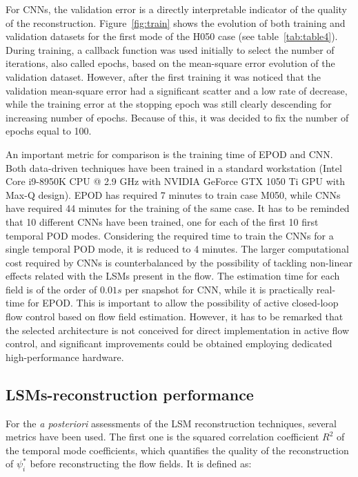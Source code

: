 For CNNs, the validation error is a directly interpretable indicator of the quality of the reconstruction.
Figure~\ref{fig:train} shows the evolution of both training and validation datasets for the first mode of the H050 case (see table~\ref{tab:table4}).
During training, a callback function was used initially to select the number of iterations, also called epochs, based on the mean-square error evolution of the validation dataset.
However, after the first training it was noticed that the validation mean-square error had a significant scatter and a low rate of decrease, while the training error at the stopping epoch was still clearly descending for increasing number of epochs. Because of this, it was decided to fix the number of epochs equal to 100.

An important metric for comparison is the training time of EPOD and CNN.
Both data-driven techniques have been trained in a standard workstation (Intel\textsuperscript{\textregistered}  Core\textsuperscript{\texttrademark} i9-8950K CPU @ 2.9 GHz with NVIDIA GeForce\textsuperscript{\textregistered} GTX 1050 Ti GPU with Max-Q design).
EPOD has required 7 minutes to train case M050, while CNNs have required 44 minutes for the training of the same case.
It has to be reminded that 10 different CNNs have been trained, one for each of the first 10 first temporal POD modes.
Considering the required time to train the CNNs for a single temporal POD mode, it is reduced to 4 minutes.
The larger computational cost required by CNNs is counterbalanced by the possibility of tackling non-linear effects related with the LSMs present in the flow.
The estimation time for each field is of the order of $0.01s$ per snapshot for CNN, while it is practically real-time for EPOD.
This is important to allow the possibility of active closed-loop flow control based on flow field estimation.
However, it has to be remarked that the selected architecture is not conceived for direct implementation in active flow control, and significant improvements could be obtained employing dedicated high-performance hardware.

\subsection{\label{sec:0302}LSMs-reconstruction performance}

For the \textit{a posteriori} assessments of the LSM reconstruction techniques, several metrics have been used.
The first one is the squared correlation coefficient $R^2$ of the temporal mode coefficients, which quantifies the quality of the reconstruction of $\psi^*_i$ before reconstructing the flow fields.
It is defined as:

